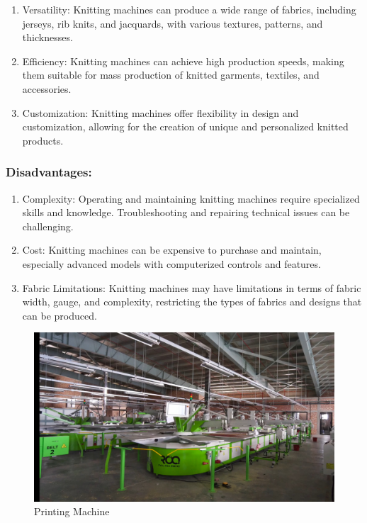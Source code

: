 \begin{enumerate}
\item
  Versatility: Knitting machines can produce a wide range of fabrics,
  including jerseys, rib knits, and jacquards, with various textures,
  patterns, and thicknesses.
\item
  Efficiency: Knitting machines can achieve high production speeds,
  making them suitable for mass production of knitted garments,
  textiles, and accessories.
\item
  Customization: Knitting machines offer flexibility in design and
  customization, allowing for the creation of unique and personalized
  knitted products.
\end{enumerate}

\subsubsection{Disadvantages:}

\begin{enumerate}
\item
  Complexity: Operating and maintaining knitting machines require
  specialized skills and knowledge. Troubleshooting and repairing
  technical issues can be challenging.
\item
  Cost: Knitting machines can be expensive to purchase and maintain,
  especially advanced models with computerized controls and features.
\item
  Fabric Limitations: Knitting machines may have limitations in terms of
  fabric width, gauge, and complexity, restricting the types of fabrics
  and designs that can be produced.
\end{enumerate}



\begin{figure}[h!]
  \centering
  \includegraphics[width=0.8\linewidth]{figs/placement_printing.jpg}
  \caption{Printing Machine}
  \label{fig:Printing Machine}
\end{figure}



